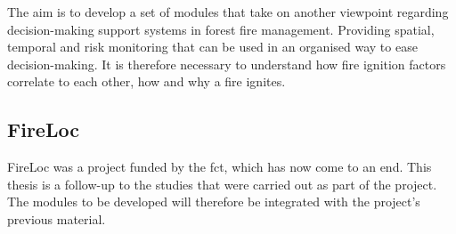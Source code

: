 The aim is to develop a set of modules that take on another viewpoint regarding decision-making support systems in forest fire management. Providing spatial, temporal and risk monitoring that can be used in an organised way to ease decision-making. It is therefore necessary to understand how fire ignition factors correlate to each other, how and why a fire ignites.






\begin{table}[h!]
\caption{Number of rural fires and corresponding extent of burnt area in mainland Portugal, per year, between 1 January and 15 October 2023 January and 15 October 2023 \cite{icnf2023report}}
\centering
{}
\label{table_2023_fires_portugal}
\end{table}

\subsection{FireLoc}
\label{fireloc}
FireLoc was a project funded by the \gls{fct}, which has now come to an end. This thesis is a follow-up to the studies that were carried out as part of the project. The modules to be developed will therefore be integrated with the project's previous material.




